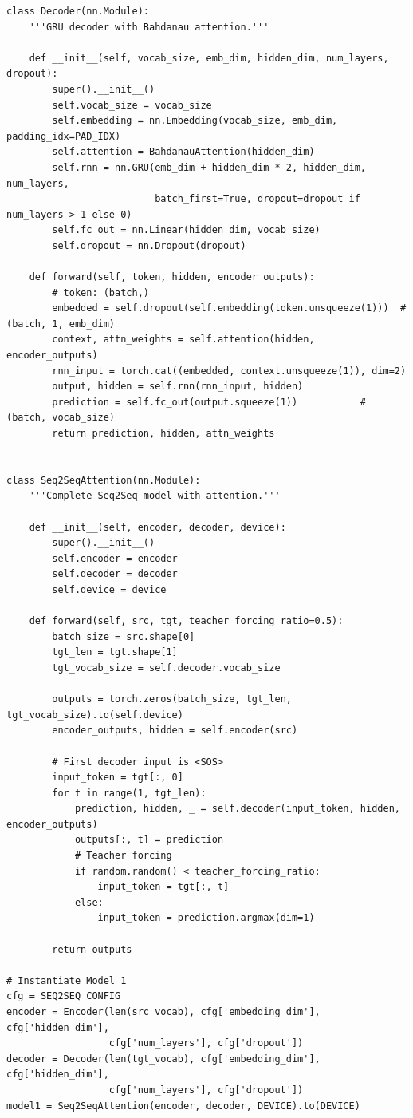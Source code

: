 \documentclass[12pt,a4paper,oneside]{report}
\begin{document}
\begin{Verbatim}[commandchars=\\\{\},breaklines=true,breakanywhere=true,fontsize=\scriptsize,frame=leftline,framesep=2mm,rulecolor=\color{gray}]
class Decoder(nn.Module):
    '''GRU decoder with Bahdanau attention.'''

    def __init__(self, vocab_size, emb_dim, hidden_dim, num_layers, dropout):
        super().__init__()
        self.vocab_size = vocab_size
        self.embedding = nn.Embedding(vocab_size, emb_dim, padding_idx=PAD_IDX)
        self.attention = BahdanauAttention(hidden_dim)
        self.rnn = nn.GRU(emb_dim + hidden_dim * 2, hidden_dim, num_layers,
                          batch_first=True, dropout=dropout if num_layers > 1 else 0)
        self.fc_out = nn.Linear(hidden_dim, vocab_size)
        self.dropout = nn.Dropout(dropout)

    def forward(self, token, hidden, encoder_outputs):
        # token: (batch,)
        embedded = self.dropout(self.embedding(token.unsqueeze(1)))  # (batch, 1, emb_dim)
        context, attn_weights = self.attention(hidden, encoder_outputs)
        rnn_input = torch.cat((embedded, context.unsqueeze(1)), dim=2)
        output, hidden = self.rnn(rnn_input, hidden)
        prediction = self.fc_out(output.squeeze(1))           # (batch, vocab_size)
        return prediction, hidden, attn_weights


class Seq2SeqAttention(nn.Module):
    '''Complete Seq2Seq model with attention.'''

    def __init__(self, encoder, decoder, device):
        super().__init__()
        self.encoder = encoder
        self.decoder = decoder
        self.device = device

    def forward(self, src, tgt, teacher_forcing_ratio=0.5):
        batch_size = src.shape[0]
        tgt_len = tgt.shape[1]
        tgt_vocab_size = self.decoder.vocab_size

        outputs = torch.zeros(batch_size, tgt_len, tgt_vocab_size).to(self.device)
        encoder_outputs, hidden = self.encoder(src)

        # First decoder input is <SOS>
        input_token = tgt[:, 0]
        for t in range(1, tgt_len):
            prediction, hidden, _ = self.decoder(input_token, hidden, encoder_outputs)
            outputs[:, t] = prediction
            # Teacher forcing
            if random.random() < teacher_forcing_ratio:
                input_token = tgt[:, t]
            else:
                input_token = prediction.argmax(dim=1)

        return outputs

# Instantiate Model 1
cfg = SEQ2SEQ_CONFIG
encoder = Encoder(len(src_vocab), cfg['embedding_dim'], cfg['hidden_dim'],
                  cfg['num_layers'], cfg['dropout'])
decoder = Decoder(len(tgt_vocab), cfg['embedding_dim'], cfg['hidden_dim'],
                  cfg['num_layers'], cfg['dropout'])
model1 = Seq2SeqAttention(encoder, decoder, DEVICE).to(DEVICE)


\end{Verbatim}
\end{document}
